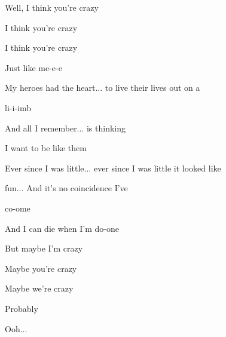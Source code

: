 \begin{song}
\bigskip

Well, I think you're crazy \par
I think you're crazy \par
I think you're crazy \par
Just like me-e-e \par

\bigskip

 My heroes had the heart... to live their lives out on a \par
{}li-i-imb  \par
And all I remember... is thinking \par
I want to be like them  \par

\bigskip

 Ever since I was little... ever since I was little it looked like \par
{}fun... And it's no coincidence I've \par
co-ome  \par
And I can die when I'm do-one  \par

\bigskip

But maybe I'm crazy \par
Maybe you're crazy \par
Maybe we're crazy \par
Probably  \par

\bigskip

 Ooh...  \par
{}   \par
{} \par

\end{song}
